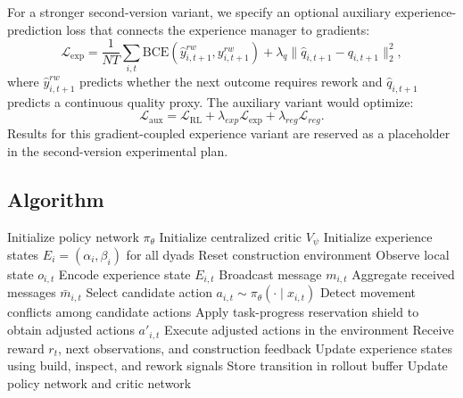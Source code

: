 \documentclass[preprint,12pt]{elsarticle}
\begin{document}
For a stronger second-version variant, we specify an optional auxiliary experience-prediction loss that connects the experience manager to gradients:
\begin{equation}
\mathcal{L}_{\mathrm{exp}}=\frac{1}{NT}\sum_{i,t}\mathrm{BCE}(\hat{y}^{rw}_{i,t+1},y^{rw}_{i,t+1})+\lambda_q\lVert \hat{q}_{i,t+1}-q_{i,t+1}\rVert_2^2,
\label{eq:exp_aux_loss}
\end{equation}
where $\hat{y}^{rw}_{i,t+1}$ predicts whether the next outcome requires rework and $\hat{q}_{i,t+1}$ predicts a continuous quality proxy. The auxiliary variant would optimize:
\begin{equation}
\mathcal{L}_{\mathrm{aux}}=\mathcal{L}_{\mathrm{RL}}+\lambda_{exp}\mathcal{L}_{\mathrm{exp}}+\lambda_{reg}\mathcal{L}_{reg}.
\end{equation}
Results for this gradient-coupled experience variant are reserved as a placeholder in the second-version experimental plan.

\subsection{Algorithm}

\begin{algorithm}[htbp]
\caption{CCT-MARL Training}
\label{alg:cct_training}
\begin{algorithmic}[1]
\STATE Initialize policy network $\pi_{\theta}$
\STATE Initialize centralized critic $V_{\psi}$
\STATE Initialize experience states $E_i=(\alpha_i,\beta_i)$ for all dyads
    \STATE Reset construction environment
            \STATE Observe local state $o_{i,t}$
            \STATE Encode experience state $E_{i,t}$
            \STATE Broadcast message $m_{i,t}$
            \STATE Aggregate received messages $\bar{m}_{i,t}$
            \STATE Select candidate action $a_{i,t} \sim \pi_{\theta}(\cdot \mid x_{i,t})$
        \ENDFOR
        \STATE Detect movement conflicts among candidate actions
        \STATE Apply task-progress reservation shield to obtain adjusted actions $a'_{i,t}$
        \STATE Execute adjusted actions in the environment
        \STATE Receive reward $r_t$, next observations, and construction feedback
        \STATE Update experience states using build, inspect, and rework signals
        \STATE Store transition in rollout buffer
    \ENDFOR
    \STATE Update policy network and critic network
\ENDFOR
\end{algorithmic}
\end{algorithm}
\end{document}
